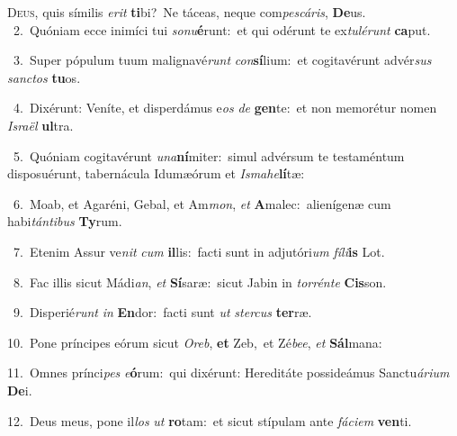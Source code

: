 \lettrine{\initial\textcolor{\initialcolor}{D}}{eus,} quis símilis \textit{e}\-\textit{rit} \textbf{ti}\-bi?~\star Ne táceas, neque com\-\textit{pes}\-\textit{cá}\textit{ris}, \textbf{De}\-us.\\
{\numbfont\textcolor{\numbcolor}{~2.}}~Quóniam ecce inimíci tui \textit{so}\-\textit{nu}\textbf{é}runt:~\star et qui odérunt te ex\-\textit{tu}\-\textit{lé}\textit{runt} \textbf{ca}\-put.\par
{\numbfont\textcolor{\numbcolor}{~3.}}~Super pópulum tuum malignavé\textit{runt} \textit{con}\-\textbf{sí}lium:~\star et cogitavérunt advér\textit{sus} \textit{sanc}\-\textit{tos} \textbf{tu}\-os.\par
{\numbfont\textcolor{\numbcolor}{~4.}}~Dixérunt: Veníte, et disperdámus e\textit{os} \textit{de} \textbf{gen}\-te:~\star et non memorétur nomen \textit{Is}\-\textit{ra}\textit{ël} \textbf{ul}\-tra.\par
{\numbfont\textcolor{\numbcolor}{~5.}}~Quóniam cogitavérunt \textit{u}\-\textit{na}\textbf{ní}miter:~\star simul advérsum te testaméntum disposuérunt, tabernácula Idumæórum et \textit{Is}\-\textit{ma}\textit{he}\textbf{lí}tæ:\par
{\numbfont\textcolor{\numbcolor}{~6.}}~Moab, et Agaréni, Gebal, et Am\-\textit{mon}\-, \textit{et} \textbf{A}\-malec:~\star alienígenæ cum habi\-\textit{tán}\-\textit{ti}\textit{bus} \textbf{Ty}\-rum.\par
{\numbfont\textcolor{\numbcolor}{~7.}}~Etenim Assur ve\textit{nit} \textit{cum} \textbf{il}\-lis:~\star facti sunt in adjutóri\textit{um} \textit{fí}\-\textit{li}\textbf{is} Lot.\par
{\numbfont\textcolor{\numbcolor}{~8.}}~Fac illis sicut Mádi\-\textit{an}\-, \textit{et} \textbf{Sí}\-saræ:~\star sicut Jabin in \textit{tor}\-\textit{rén}\textit{te} \textbf{Cis}\-son.\par
{\numbfont\textcolor{\numbcolor}{~9.}}~Disperié\textit{runt} \textit{in} \textbf{En}\-dor:~\star facti sunt \textit{ut} \textit{ster}\-\textit{cus} \textbf{ter}\-ræ.\par
{\numbfont\textcolor{\numbcolor}{10.}}~Pone príncipes eórum sicut \textit{O}\-\textit{reb}, \textbf{et} Zeb,~\star et Zé\-\textit{be}\-\textit{e}, \textit{et} \textbf{Sál}\-mana:\par
{\numbfont\textcolor{\numbcolor}{11.}}~Omnes prínci\textit{pes} \textit{e}\-\textbf{ó}rum:~\star qui dixérunt: Hereditáte possideámus Sanctu\-\textit{á}\-\textit{ri}\textit{um} \textbf{De}\-i.\par
{\numbfont\textcolor{\numbcolor}{12.}}~Deus meus, pone il\textit{los} \textit{ut} \textbf{ro}\-tam:~\star et sicut stípulam ante \textit{fá}\-\textit{ci}\textit{em} \textbf{ven}\-ti.\par
